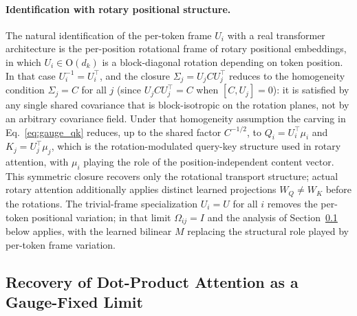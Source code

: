 \documentclass[11pt]{article}
\begin{document}
\paragraph{Identification with rotary positional structure.}
The natural identification of the per-token frame $U_i$ with a real transformer architecture is the per-position rotational frame of rotary positional embeddings, in which $U_i \in \mathrm{O}(d_k)$ is a block-diagonal rotation depending on token position. In that case $U_i^{-1} = U_i^\top$, and the closure $\Sigma_j = U_j C U_j^\top$ reduces to the homogeneity condition $\Sigma_j = C$ for all $j$ (since $U_j C U_j^\top = C$ when $[C, U_j] = 0$): it is satisfied by any single shared covariance that is block-isotropic on the rotation planes, not by an arbitrary covariance field. Under that homogeneity assumption the carving in Eq.~\eqref{eq:gauge_qk} reduces, up to the shared factor $C^{-1/2}$, to $Q_i = U_i^\top\mu_i$ and $K_j = U_j^\top\mu_j$, which is the rotation-modulated query-key structure used in rotary attention, with $\mu_i$ playing the role of the position-independent content vector. This symmetric closure recovers only the rotational transport structure; actual rotary attention additionally applies distinct learned projections $W_Q \neq W_K$ before the rotations. The trivial-frame specialization $U_i = U$ for all $i$ removes the per-token positional variation; in that limit $\Omega_{ij} = I$ and the analysis of Section~\ref{sec:dot_product_derivation} below applies, with the learned bilinear $M$ replacing the structural role played by per-token frame variation.

\subsection{Recovery of Dot-Product Attention as a Gauge-Fixed Limit}
\label{sec:dot_product_derivation}
\end{document}
